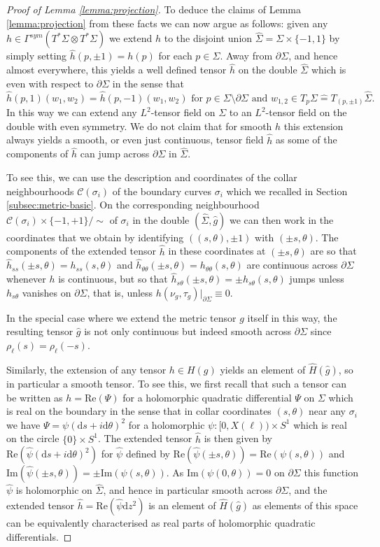 \documentclass[10pt,reqno]{amsart}
\theoremstyle{plain}
\theoremstyle{definition}
\numberwithin{equation}{section}
\newcommand{\si}{\sigma}
\newcommand{\Si}{\Sigma}
\newcommand{\beq}{\begin{equation}}
\newcommand{\eeq}{\end{equation}}
\newcommand{\dd}{\mathrm{d}} %
\newcommand{\Col}{\mathcal C}
\newcommand{\pSi}{{\partial \Sigma}}
\newcommand{\Rea}{\text{Re}}
\newcommand{\Ima}{\text{Im}}
\begin{document}
\begin{proof}[Proof of Lemma \ref{lemma:projection}]
    To deduce the claims of Lemma \ref{lemma:projection} from these facts we can now argue as follows: given any $h\in \Gamma^{sym}(T^*\Si\otimes T^*\Si)$ we extend $h$ to the disjoint union $\hat\Si=\Si\times \{-1,1\}$ by simply setting $\hat h(p,\pm 1)=h(p)$ for each $p\in\Si$. Away from $\partial \Si$, and hence almost everywhere, this yields a well defined tensor $\hat h$ on the double $\hat\Si$ which is even with respect to $\pSi$ in the sense that 
    \beq\label{eq:even}
        \hat h(p,1)(w_1,w_2)=\hat h(p,-1)(w_1,w_2) \text{ for } p\in \Si\setminus \pSi \text{ and } w_{1,2}\in T_p\Si{\hat =}T_{(p,\pm 1)}\hat\Si.
    \eeq
    In this way we can extend any $L^2$-tensor field on $\Si$ to an $L^2$-tensor field on the double with even symmetry. We do not claim that for smooth $h$ this extension always yields a smooth, or even just continuous, tensor field $\hat h$ as some of the components of $\hat h$ can jump across $\pSi$ in $\hat\Si$.

    To see this, we can use the description and coordinates of the collar neighbourhoods $\Col(\si_i)$ of the boundary curves $\si_i$ which we recalled in Section \ref{subsec:metric-basic}. On the corresponding neighbourhood $\Col(\si_i)\times\{-1,+1\}/\sim$ of $ \si_i$ in the double $(\hat\Si,\hat g)$ we can then work in the coordinates that we obtain by identifying $((s,\theta),\pm 1)$ with $(\pm s,\theta)$. The components of the extended tensor $\hat h$ in these coordinates at $(\pm s,\theta)$ are so that $\hat h_{ss}(\pm s,\theta)=h_{ss}(s,\theta)$ and $\hat h_{\theta\theta}(\pm s,\theta)=h_{\theta\theta}( s,\theta)$ are continuous across $\pSi$ whenever $h$ is continuous, but so that $\hat h_{s\theta}(\pm s,\theta)=\pm h_{s\theta}(s,\theta)$ jumps unless $h_{s\theta}$ vanishes on $\partial \Si$, that is, unless $h(\nu_g,\tau_g)\vert_\pSi\equiv 0$. 
    
    In the special case where we extend the metric tensor $g$ itself in this way, the resulting tensor $\hat g$ is not only continuous but indeed smooth across $\pSi$ since $\rho_\ell(s)=\rho_\ell(-s)$.
    
    Similarly, the extension of any tensor $h\in H(g)$ yields an element of $\hat H(\hat g)$, so in particular a smooth tensor. To see this, we first recall that such a tensor can be written as   $h=\Rea(\Psi)$ for a  holomorphic quadratic differential $\Psi$ on $\Si$ which is real on the boundary in the sense that in collar coordinates $(s,\theta)$ near any $\si_i$ we have $\Psi=\psi (\dd s+i \dd\theta)^2$ for a holomorphic $\psi:[0,X(\ell))\times S^1$ which is real on the circle $\{0\}\times S^1$. The extended tensor $\hat h$ is then given by $\Rea(\hat\psi (\dd s+i\dd\theta)^2)$ for $\hat\psi$ defined by $\Rea(\hat\psi(\pm s,\theta))=\Rea(\psi(s,\theta))$ and $\Ima(\hat\psi(\pm s,\theta))=\pm\Ima(\psi(s,\theta))$. As $\Ima(\psi(0,\theta))=0$ on $\pSi$ this function $\hat\psi$ is holomorphic on $\hat\Si$, and hence in particular smooth across $\partial \Si$, and the extended tensor $\hat h=\Rea(\hat\psi \dd z^2)$ is an element of $\hat H(\hat g)$ as elements of this space can be equivalently characterised as real parts of holomorphic quadratic differentials. 
    

\end{proof}
\end{document}
